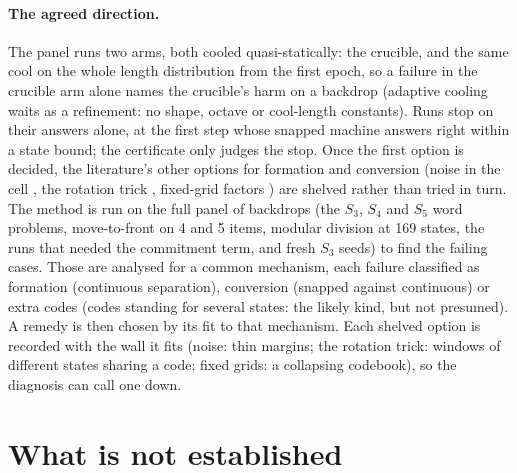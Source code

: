 \documentclass[11pt]{article}
\begin{document}
\paragraph{The agreed direction.} The panel runs two arms, both cooled quasi-statically: the crucible,
and the same cool on the whole length distribution from the first epoch, so a failure in the
crucible arm alone names the crucible's harm on a backdrop (adaptive cooling waits as a refinement:
no shape, octave or cool-length constants). Runs stop on their answers alone, at the first step
whose snapped machine answers right within a state bound; the certificate only judges the stop.
Once the first option is decided, the literature's other options
for formation and conversion (noise in the cell \citep{oliva-2020-stability-internal-states-rnn-regular-languages},
the rotation trick \citep{fifty-2024-rotation-trick-vector-quantization}, fixed-grid factors
\citep{mentzer-2023-finite-scalar-quantization}) are shelved rather than tried in turn. The method is
run on the full panel of backdrops (the $S_3$, $S_4$ and $S_5$ word problems, move-to-front on 4 and
5 items, modular division at 169 states, the runs that needed the commitment term, and fresh $S_3$
seeds) to find the failing cases. Those are analysed for a common mechanism, each failure classified
as formation (continuous separation), conversion (snapped against continuous) or extra codes (codes
standing for several states: the likely kind, but not presumed). A
remedy is then chosen by its fit to that mechanism. Each shelved option is recorded with the wall it
fits (noise: thin margins; the rotation trick: windows of different states sharing a code; fixed
grids: a collapsing codebook), so the diagnosis can call one down.

\section{What is not established}
\label{sec:open}
\end{document}
